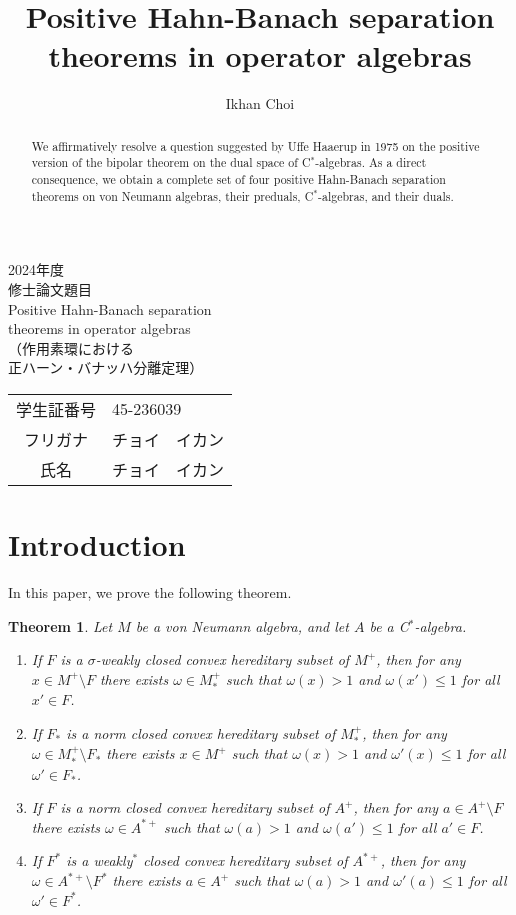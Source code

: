 \documentclass[noamsfonts,a4paper,10pt]{amsart}
\title{Positive Hahn-Banach separation theorems in operator algebras}
\author{Ikhan Choi}
\theoremstyle{plain}
\newtheorem*{thm*}{Theorem}
\theoremstyle{definition}
\theoremstyle{remark}
\begin{document}
\begin{center}
{\huge 2024年度}\\[36pt]
{\Huge 修士論文題目}\\[24pt]
{\Huge Positive Hahn-Banach separation\\[8pt]
theorems in operator algebras}\\[24pt]
{\huge （作用素環における\\[8pt]正ハーン・バナッハ分離定理）}
\vfill
\begin{tabular}{cl}
{\LARGE 学生証番号} & {\LARGE 45-236039}\\[8pt]
フリガナ & チョイ　イカン\\[8pt]
{\LARGE 氏名} & {\LARGE チョイ　イカン}\\[24pt]
\end{tabular}
\end{center}
\thispagestyle{empty}
\addtocounter{page}{-1}


\newpage

\begin{abstract}
We affirmatively resolve a question suggested by Uffe Haaerup in 1975 on the positive version of the bipolar theorem on the dual space of C$^*$-algebras.
As a direct consequence, we obtain a complete set of four positive Hahn-Banach separation theorems on von Neumann algebras, their preduals, C$^*$-algebras, and their duals.
\end{abstract}

\maketitle

\section{Introduction}

In this paper, we prove the following theorem.

\begin{thm*}
Let $M$ be a von Neumann algebra, and let $A$ be a C$^*$-algebra.
\begin{enumerate}
\item If $F$ is a $\sigma$-weakly closed convex hereditary subset of $M^+$, then for any $x\in M^+\setminus F$ there exists $\omega\in M_*^+$ such that $\omega(x)>1$ and $\omega(x')\le1$ for all $x'\in F$.
\item If $F_*$ is a norm closed convex hereditary subset of $M_*^+$, then for any $\omega\in M_*^+\setminus F_*$ there exists $x\in M^+$ such that $\omega(x)>1$ and $\omega'(x)\le1$ for all $\omega'\in F_*$.
\item If $F$ is a norm closed convex hereditary subset of $A^+$, then for any $a\in A^+\setminus F$\quad there exists $\omega\in A^{*+}$ such that $\omega(a)>1$ and $\omega(a')\le1$ for all $a'\in F$.
\item If $F^*$ is a weakly$^*$ closed convex hereditary subset of $A^{*+}$, then for any $\omega\in A^{*+}\setminus F^*$ there exists $a\in A^+$ such that $\omega(a)>1$ and $\omega'(a)\le1$ for all $\omega'\in F^*$.
\end{enumerate}
\end{thm*}
\end{document}
